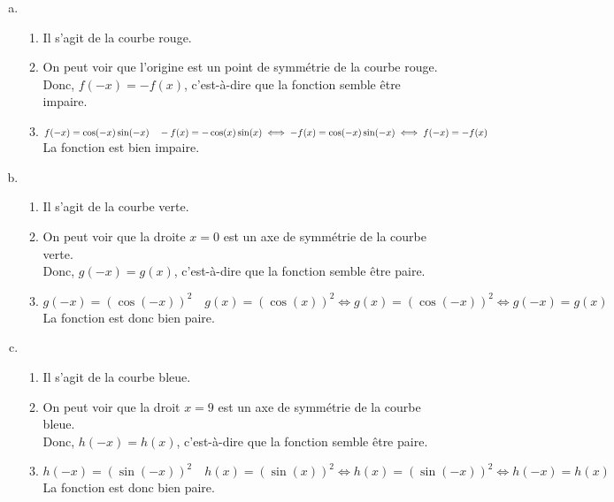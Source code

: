 \documentclass[12pt, a4paper]{article}
\begin{document}
\begin{Exercise}[number={81}]
\begin{center}
\end{center}
    \parbox{\linewidth}{}
    \begin{enumerate}[a)]
        \item   \begin{enumerate}[1)]
                    \item Il s'agit de la courbe rouge.
                    \item On peut voir que l'origine est un point de symmétrie de la courbe rouge. \\ Donc, $f(-x)=-f(x)$, c'est-à-dire que la fonction semble être impaire.
                    \item $f(-x)=\cos(-x)\sin(-x) \quad -f(x)=-\cos(x)\sin(x)\iff -f(x)=\cos(-x)\sin(-x)\\\iff f(-x)=-f(x)$ \quad La fonction est bien impaire.
                \end{enumerate}\smallbreak
        \item   \begin{enumerate}[1)]
                    \item Il s'agit de la courbe verte.
                    \item On peut voir que la droite $x=0$ est un axe de symmétrie de la courbe verte. \\ Donc, $g(-x)=g(x)$, c'est-à-dire que la fonction semble être paire.
                    \item $g(-x)=\left(\cos(-x)\right)^2 \quad g(x)=\left(\cos(x)\right)^2\iff g(x)=\left(\cos(-x)\right)^2\iff g(-x)=g(x)$ \\ La fonction est donc bien paire.
                \end{enumerate}\smallbreak
        \item   \begin{enumerate}[1)]
                    \item Il s'agit de la courbe bleue.
                    \item On peut voir que la droit $x=9$ est un axe de symmétrie de la courbe bleue. \\ Donc, $h(-x)=h(x)$, c'est-à-dire que la fonction semble être paire.
                    \item $h(-x)=\left(\sin(-x)\right)^2 \quad h(x)=\left(\sin(x)\right)^2\iff h(x)=\left(\sin(-x)\right)^2\iff h(-x)=h(x)$ \\ La fonction est donc bien paire.

\end{enumerate}
\end{enumerate}
\end{Exercise}
\end{document}
